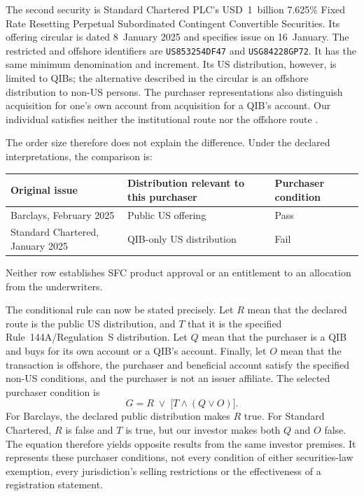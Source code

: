 \documentclass[12pt,a4paper,oneside,openany]{book}
\begin{document}
The second security is Standard Chartered PLC's USD~1~billion 7.625\% Fixed Rate
Resetting Perpetual Subordinated Contingent Convertible Securities. Its offering
circular is dated 8~January 2025 and specifies issue on 16~January. The restricted
and offshore identifiers are \texttt{US853254DF47} and \texttt{USG84228GP72}.
It has the same minimum denomination and increment. Its US distribution,
however, is limited to QIBs; the alternative described in the circular is an
offshore distribution to non-US persons. The purchaser representations also
distinguish acquisition for one's own account from acquisition for a QIB's
account. Our individual satisfies neither the institutional route nor the
offshore route \citep[pp.~i, 14--15, 140 and 148--149]{standardcharteredcoco2025}.

The order size therefore does not explain the difference. Under the declared
interpretations, the comparison is:
\begin{center}
\begin{tabularx}{\linewidth}{@{}lXl@{}}
\toprule
Original issue & Distribution relevant to this purchaser & Purchaser condition \\
\midrule
Barclays, February 2025 & Public US offering & Pass \\
Standard Chartered, January 2025 & QIB-only US distribution & Fail \\
\bottomrule
\end{tabularx}
\end{center}
Neither row establishes SFC product approval or an entitlement to an allocation
from the underwriters.

The conditional rule can now be stated precisely. Let $R$ mean that the
declared route is the public US distribution, and $T$ that it is the specified
Rule~144A/Regulation~S distribution. Let $Q$ mean that the purchaser is a QIB
and buys for its own account or a QIB's account. Finally, let $O$ mean that the
transaction is offshore, the purchaser and beneficial account satisfy the
specified non-US conditions, and the purchaser is not an issuer affiliate.
The selected purchaser condition is
\[
   G = R \;\lor\; \bigl[T\land(Q\lor O)\bigr].
\]
For Barclays, the declared public distribution makes $R$ true. For Standard
Chartered, $R$ is false and $T$ is true, but our investor makes both $Q$ and $O$
false. The equation therefore yields opposite results from the same investor
premises. It represents these purchaser conditions, not every condition of
either securities-law exemption, every jurisdiction's selling restrictions or
the effectiveness of a registration statement.
\end{document}
